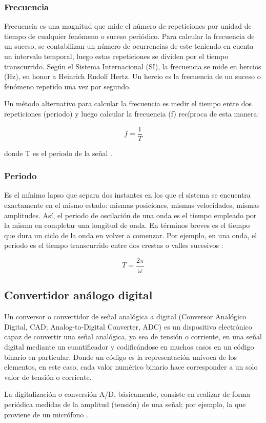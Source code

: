 \documentclass[comsoc, journal]{IEEEtran}
\begin{document}
\subsubsection{Frecuencia}
Frecuencia es una magnitud que mide el número de repeticiones por unidad de tiempo de cualquier fenómeno o suceso periódico. Para calcular la frecuencia de un suceso, se contabilizan un número de ocurrencias de este teniendo en cuenta un intervalo temporal, luego estas repeticiones se dividen por el tiempo transcurrido. Según el Sistema Internacional (SI), la frecuencia se mide en hercios (Hz), en honor a Heinrich Rudolf Hertz. Un hercio es la frecuencia de un suceso o fenómeno repetido una vez por segundo.

Un método alternativo para calcular la frecuencia es medir el tiempo entre dos repeticiones (periodo) y luego calcular la frecuencia (f) recíproca de esta manera:

$$f = \frac{1}{T}$$

donde T es el periodo de la señal \cite{serway}.
\subsubsection{Periodo}
Es el mínimo lapso que separa dos instantes en los que el sistema se encuentra exactamente en el mismo estado: mismas posiciones, mismas velocidades, mismas amplitudes. Así, el periodo de oscilación de una onda es el tiempo empleado por la misma en completar una longitud de onda. En términos breves es el tiempo que dura un ciclo de la onda en volver a comenzar. Por ejemplo, en una onda, el periodo es el tiempo transcurrido entre dos crestas o valles sucesivos \cite{serway}:

$$T = \frac {2\pi}{\omega}$$

\subsection{Convertidor análogo digital}
Un conversor o convertidor de señal analógica a digital (Conversor Analógico Digital, CAD; Analog-to-Digital Converter, ADC) es un dispositivo electrónico capaz de convertir una señal analógica, ya sea de tensión o corriente, en una señal digital mediante un cuantificador y codificándose en muchos casos en un código binario en particular. Donde un código es la representación unívoca de los elementos, en este caso, cada valor numérico binario hace corresponder a un solo valor de tensión o corriente.

La digitalización o conversión A/D, básicamente, consiste en realizar de forma periódica medidas de la amplitud (tensión) de una señal; por ejemplo, la que proviene de un micrófono \cite{walden}.
\end{document}
